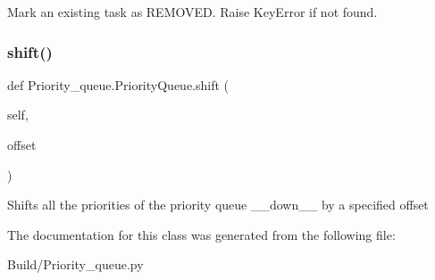 \begin{DoxyVerb}Mark an existing task as REMOVED.  Raise KeyError if not found.\end{DoxyVerb}
 \mbox{\label{class_priority__queue_1_1_priority_queue_a19c99c56b8204a717b12b3a32301a7d8}} 
\subsubsection{\texorpdfstring{shift()}{shift()}}
{\footnotesize\ttfamily def Priority\+\_\+queue.\+Priority\+Queue.\+shift (\begin{DoxyParamCaption}\item[{}]{self,  }\item[{}]{offset }\end{DoxyParamCaption})}

\begin{DoxyVerb}Shifts all the priorities of the priority queue __down__ by a specified offset\end{DoxyVerb}
 

The documentation for this class was generated from the following file\+:\begin{DoxyCompactItemize}
\item 
Build/Priority\+\_\+queue.\+py\end{DoxyCompactItemize}
